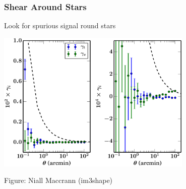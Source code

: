 \documentclass{beamer}
\begin{document}
\frame
{
    \frametitle{Shear Around Stars}

    Look for spurious signal round stars

    \begin{center}
        \includegraphics[width=0.7\textwidth]{star_gal_cs85_m16-22.pdf}
    \end{center}
    {\tiny Figure: Niall Maccrann (im3shape)}
}

\end{document}
